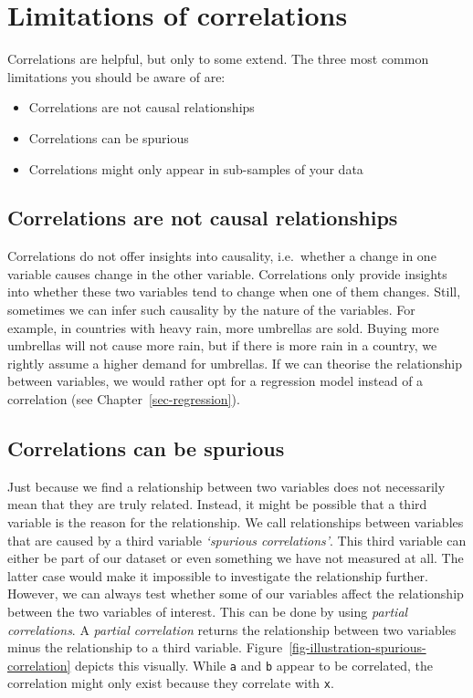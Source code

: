 \documentclass[
  letterpaper,
]{krantz}
\begin{document}
\section{Limitations of
correlations}\label{sec-limitations-of-correlations}

Correlations are helpful, but only to some extend. The three most common
limitations you should be aware of are:

\begin{itemize}
\item
  Correlations are not causal relationships
\item
  Correlations can be spurious
\item
  Correlations might only appear in sub-samples of your data
\end{itemize}

\subsection{Correlations are not causal
relationships}\label{sec-correlations-are-not-causal-relationships}

Correlations do not offer insights into causality, i.e.~whether a change
in one variable causes change in the other variable. Correlations only
provide insights into whether these two variables tend to change when
one of them changes. Still, sometimes we can infer such causality by the
nature of the variables. For example, in countries with heavy rain, more
umbrellas are sold. Buying more umbrellas will not cause more rain, but
if there is more rain in a country, we rightly assume a higher demand
for umbrellas. If we can theorise the relationship between variables, we
would rather opt for a regression model instead of a correlation (see
Chapter~\ref{sec-regression}).

\subsection{Correlations can be
spurious}\label{sec-correlations-can-be-spurious}

Just because we find a relationship between two variables does not
necessarily mean that they are truly related. Instead, it might be
possible that a third variable is the reason for the relationship. We
call relationships between variables that are caused by a third variable
\emph{`spurious correlations'}. This third variable can either be part
of our dataset or even something we have not measured at all. The latter
case would make it impossible to investigate the relationship further.
However, we can always test whether some of our variables affect the
relationship between the two variables of interest. This can be done by
using \emph{partial correlations}. A \emph{partial correlation} returns
the relationship between two variables minus the relationship to a third
variable. Figure~\ref{fig-illustration-spurious-correlation} depicts
this visually. While \texttt{a} and \texttt{b} appear to be correlated,
the correlation might only exist because they correlate with \texttt{x}.
\end{document}

